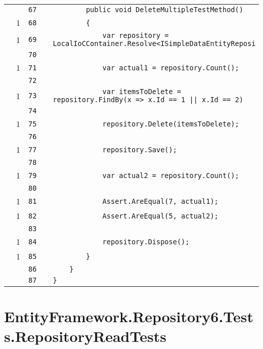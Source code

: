 \documentclass[a4paper,10pt]{article}
\begin{document}
\begin{longtable}[l]{lrrll}
\cellcolor{gray} &  & \verb~67~ & & \verb~        public void DeleteMultipleTestMethod()~\\
\cellcolor{green} & 1 & \verb~68~ & & \verb~        {~\\
\cellcolor{green} & 1 & \verb~69~ & & \verb~            var repository = LocalIoCContainer.Resolve<ISimpleDataEntityReposi~\\
\cellcolor{gray} &  & \verb~70~ & & \verb~~\\
\cellcolor{green} & 1 & \verb~71~ & & \verb~            var actual1 = repository.Count();~\\
\cellcolor{gray} &  & \verb~72~ & & \verb~~\\
\cellcolor{green} & 1 & \verb~73~ & & \verb~            var itemsToDelete = repository.FindBy(x => x.Id == 1 || x.Id == 2)~\\
\cellcolor{gray} &  & \verb~74~ & & \verb~~\\
\cellcolor{green} & 1 & \verb~75~ & & \verb~            repository.Delete(itemsToDelete);~\\
\cellcolor{gray} &  & \verb~76~ & & \verb~~\\
\cellcolor{green} & 1 & \verb~77~ & & \verb~            repository.Save();~\\
\cellcolor{gray} &  & \verb~78~ & & \verb~~\\
\cellcolor{green} & 1 & \verb~79~ & & \verb~            var actual2 = repository.Count();~\\
\cellcolor{gray} &  & \verb~80~ & & \verb~~\\
\cellcolor{green} & 1 & \verb~81~ & & \verb~            Assert.AreEqual(7, actual1);~\\
\cellcolor{green} & 1 & \verb~82~ & & \verb~            Assert.AreEqual(5, actual2);~\\
\cellcolor{gray} &  & \verb~83~ & & \verb~~\\
\cellcolor{green} & 1 & \verb~84~ & & \verb~            repository.Dispose();~\\
\cellcolor{green} & 1 & \verb~85~ & & \verb~        }~\\
\cellcolor{gray} &  & \verb~86~ & & \verb~    }~\\
\cellcolor{gray} &  & \verb~87~ & & \verb~}~\\
\end{longtable}
\newpage
\section{EntityFramework.Repository6.Tests.RepositoryReadTests}
\end{document}
